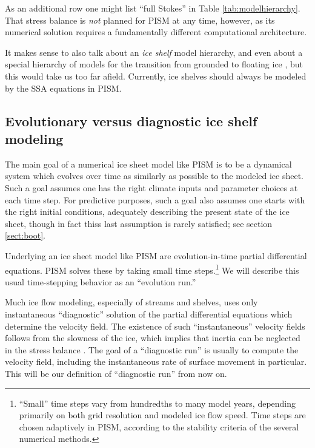\documentclass[11pt,final]{amsart}
\begin{document}
As an additional row one might list ``full Stokes'' in Table \ref{tab:modelhierarchy}.  That stress balance is \emph{not} planned for PISM at any time, however, as its numerical solution requires a fundamentally different computational architecture.

It makes sense to also talk about an \emph{ice shelf} model hierarchy, and even about a special hierarchy of models for the transition from grounded to floating ice \cite{SchoofMarine1}, but this would take us too far afield.  Currently, ice shelves should always be modeled by the SSA equations in PISM.


\subsection{Evolutionary versus diagnostic ice shelf modeling} \label{subsect:basicmodes}    The main goal of a numerical ice sheet model like PISM is to be a dynamical system which evolves over time as similarly as possible to the modeled ice sheet.  Such a goal assumes one has the right climate inputs and parameter choices at each time step.  For predictive purposes, such a goal also assumes one starts with the right initial conditions, adequately describing the present state of the ice sheet, though in fact thiss last assumption is rarely satisfied; see section \ref{sect:boot}.

Underlying an ice sheet model like PISM are evolution-in-time partial differential equations.  PISM solves these by taking small time steps.\footnote{``Small'' time steps vary from hundredths to many model years, depending primarily on both grid resolution and modeled ice flow speed.  Time steps are chosen adaptively in PISM, according to the stability criteria of the several numerical methods.}  We will describe this usual time-stepping behavior as an ``evolution run.''

Much ice flow modeling, especially of streams and shelves, uses only instantaneous ``diagnostic'' solution of the partial differential equations which determine the velocity field.  The existence of such ``instantaneous'' velocity fields follows from the slowness of the ice, which implies that inertia can be neglected in the stress balance \cite{Fowler}.  The goal of a ``diagnostic run'' is usually to compute the velocity field, including the instantaneous rate of surface movement in particular.  This will be our definition of ``diagnostic run'' from now on.
\end{document}
